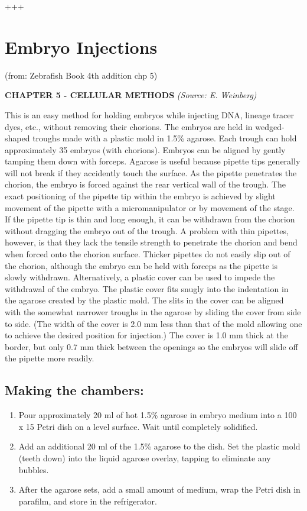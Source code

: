 \documentclass[
]{book}
\providecommand{\tightlist}{%
  \setlength{\itemsep}{0pt}\setlength{\parskip}{0pt}}
\begin{document}
+++

\hypertarget{embryo-injections}{%
\section{Embryo Injections}\label{embryo-injections}}

(from: Zebrafish Book 4th addition chp 5)

\textbf{CHAPTER 5 - CELLULAR METHODS}
\emph{(Source: E. Weinberg)}

This is an easy method for holding embryos while injecting DNA, lineage tracer dyes, etc., without removing their chorions. The embryos are held in wedged-shaped troughs made with a plastic mold in 1.5\% agarose. Each trough can hold approximately 35 embryos (with chorions). Embryos can be aligned by gently tamping them down with forceps. Agarose is useful because pipette tips generally will not break if they accidently touch the surface. As the pipette penetrates the chorion, the embryo is forced against the rear vertical wall of the trough. The exact positioning of the pipette tip within the embryo is achieved by slight movement of the pipette with a micromanipulator or by movement of the stage.
If the pipette tip is thin and long enough, it can be withdrawn from the chorion without dragging the embryo out of the trough. A problem with thin pipettes, however, is that they lack the tensile strength to penetrate the chorion and bend when forced onto the chorion surface. Thicker pipettes do not easily slip out of the chorion, although the embryo can be held with forceps as the pipette is slowly withdrawn.
Alternatively, a plastic cover can be used to impede the withdrawal of the embryo. The plastic cover fits snugly into the indentation in the agarose created by the plastic mold. The slits in the cover can be aligned with the somewhat narrower troughs in the agarose by sliding the cover from side to side. (The width of the cover is 2.0 mm less than that of the mold allowing one to achieve the desired position for injection.) The cover is 1.0 mm thick at the border, but only 0.7 mm thick between the openings so the embryos will slide off the pipette more readily.

\hypertarget{making-the-chambers}{%
\subsection{Making the chambers:}\label{making-the-chambers}}

\begin{enumerate}
\def\labelenumi{\arabic{enumi}.}
\tightlist
\item
  Pour approximately 20 ml of hot 1.5\% agarose in embryo medium into a 100 x 15 Petri dish on a level surface. Wait until completely solidified.
\item
  Add an additional 20 ml of the 1.5\% agarose to the dish. Set the plastic mold (teeth down) into the liquid agarose overlay, tapping to eliminate any bubbles.
\item
  After the agarose sets, add a small amount of medium, wrap the Petri dish in parafilm, and store in the refrigerator.
\end{enumerate}
\end{document}
